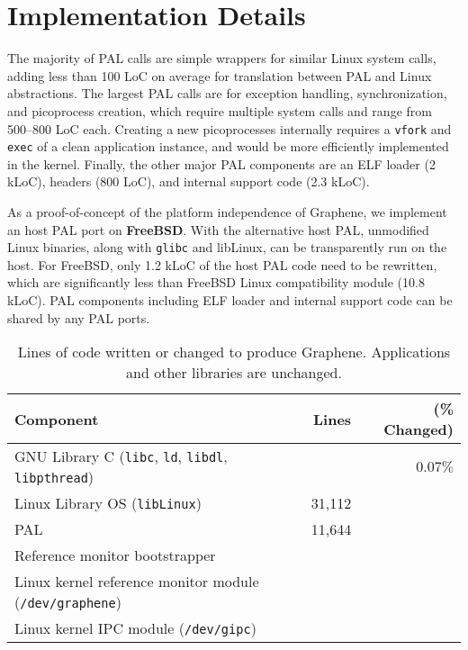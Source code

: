 \section{Implementation Details}
\label{sec:impl}

The majority of PAL calls are simple wrappers for similar Linux system calls, 
adding less than 100 LoC on average for translation between PAL and Linux abstractions.
The largest PAL calls are for exception handling, synchronization, and picoprocess
creation, which require multiple system calls and range from 500--800 LoC each.
Creating a new picoprocesses internally requires a {\tt vfork} and {\tt exec} of a clean 
application instance, and would be more efficiently implemented in the kernel.
Finally, the other major PAL components are an ELF loader (2 kLoC), headers (800 LoC),
and internal support code (2.3 kLoC).

\vspace{5pt}
As a proof-of-concept of the platform independence of Graphene,
we implement an host PAL port on {\bf FreeBSD}.
With the alternative host PAL, unmodified Linux binaries,
along with {\tt glibc} and {libLinux},
can be transparently run on the host.
For FreeBSD,
only 1.2 kLoC of the host PAL code need to be rewritten,
which are significantly less than FreeBSD Linux compatibility module (10.8 kLoC).
PAL components including ELF loader and internal support code can be shared by any PAL ports.


\begin{table}[t!b!]
\footnotesize
\centering
\begin{tabular}{|l|rr|}
\hline
{\bf Component} & {\bf Lines} & ({\bf \% Changed})\\
\hline
GNU Library C ({\tt libc}, {\tt ld}, {\tt libdl}, {\tt libpthread}) & \libclines{} & $0.07\%$ \\
\hline
Linux Library OS ({\tt libLinux}) & 31,112 & \\
PAL & 11,644 & \\
\hline
Reference monitor bootstrapper & {} & \\
Linux kernel reference monitor module ({\tt /dev/graphene}) & \sandboxmodlines{} & \\
Linux kernel IPC module ({\tt /dev/gipc}) & \gipclines{} & \\
\hline
\end{tabular}
\caption{Lines of code written or changed to produce Graphene.  Applications and other libraries are unchanged.}
\label{tab:LoC}
\end{table}


